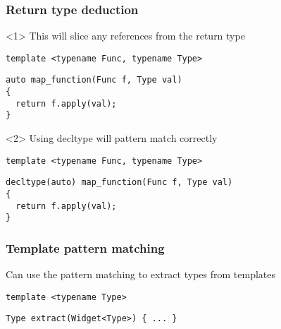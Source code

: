 \documentclass[14pt,a4paper,dvipsnames,usenames]{beamer}
\begin{document}
\begin{frame}[fragile]
  \frametitle{Return type deduction}

  \begin{onlyenv}<1>
  This will slice any references from the return type

  \vspace{.5cm}
  \begin{lstlisting}
template <typename Func, typename Type>
  \end{lstlisting}
  \vspace*{-.4cm}
  \begin{lstlisting}[morekeywords={Func,Type,decltype},deletekeywords={map}]
auto map_function(Func f, Type val)
{
  return f.apply(val);
}
  \end{lstlisting}
  \end{onlyenv}

  \begin{onlyenv}<2>
  Using {\color{FeebleWeek}decltype} will pattern match correctly

  \vspace{.5cm}
  \begin{lstlisting}
template <typename Func, typename Type>
  \end{lstlisting}
  \vspace*{-.4cm}
  \begin{lstlisting}[morekeywords={Func,Type,decltype},deletekeywords={map}]
decltype(auto) map_function(Func f, Type val)
{
  return f.apply(val);
}
  \end{lstlisting}
  \end{onlyenv}

\end{frame}

\begin{frame}[fragile]
  \frametitle{Template pattern matching}

  Can use the pattern matching to extract types from templates

  \vspace{.5cm}
  \begin{lstlisting}[basicstyle=\ttfamily]
template <typename Type>
  \end{lstlisting}
  \vspace*{-.4cm}
  \begin{lstlisting}[basicstyle=\ttfamily,morekeywords={Type}]
Type extract(Widget<Type>) { ... }
  \end{lstlisting}
  
\end{frame}
\end{document}

